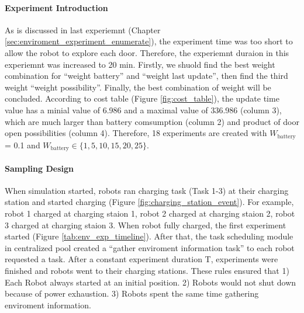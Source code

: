 \paragraph{Experiment Introduction} 
As is discussed in last experiemnt (Chapter \ref{sec:enviroment_experiment_enumerate}), the experiment time was too short to allow the robot to explore each door. Therefore, the experiemnt duraion in this experiemnt was increased to 20 min.
Firstly, we shuold find the best weight combination for ``weight battery'' and ``weight last update'', then find the third weight ``weight possibility''. Finally, the best combination of weight will be concluded.
 According to cost table (Figure \ref{fig:cost_table}), the update time value has a minial value of 6.986 and a maximal value of 336.986 (column 3), which are much larger than battery comsumption (column 2) and product of door open possibilities (column 4).
  Therefore, 18 experiments are created with $W_{\mbox{battery}}$
   = 0.1  and $W_{\mbox{battery}} \in \{1,5,10,15,20,25 \}$.

\paragraph{Sampling Design} When simulation started, robots ran charging task (Task 1-3) at their charging station and started charging (Figure \ref{fig:charging_station_event}). For example, robot 1 charged at charging staion 1, robot 2 charged at charging staion 2, robot 3 charged at charging staion 3. When robot fully charged, the first experiment started (Figure \ref{tab:env_exp_timeline}). After that, the task scheduling module in centralized pool created a ``gather enviroment information task'' to each robot requested a task. After a constant experiment duration T, experiments were finished and robots went to their charging stations. These rules ensured that 1) Each Robot always started at an initial position. 2) Robots would not shut down because of power exhaustion. 3) Robots spent the same time gathering enviroment information.

